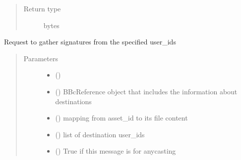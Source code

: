 \documentclass[letterpaper,10pt,english]{sphinxmanual}
\begin{document}
\begin{fulllineitems}
\begin{fulllineitems}
\begin{quote}
\begin{description}
\item[{Return type}] \leavevmode
bytes

\end{description}\end{quote}

\end{fulllineitems}


\begin{fulllineitems}
\label{\detokenize{bbc1.core.bbc_app:bbc1.core.bbc_app.BBcAppClient.gather_signatures}}
Request to gather signatures from the specified user\_ids
\begin{quote}\begin{description}
\item[{Parameters}] \leavevmode\begin{itemize}
\item {} 
 ({\hyperref[\detokenize{bbc1.core.bbclib:bbc1.core.bbclib.BBcTransaction}]{}}) \textendash{} 

\item {} 
 ({\hyperref[\detokenize{bbc1.core.bbclib:bbc1.core.bbclib.BBcReference}]{}}) \textendash{} BBcReference object that includes the information about destinations

\item {} 
 () \textendash{} mapping from asset\_id to its file content

\item {} 
 () \textendash{} list of destination user\_ids

\item {} 
 () \textendash{} True if this message is for anycasting

\end{itemize}


\end{description}
\end{quote}
\end{fulllineitems}
\end{fulllineitems}
\end{document}
